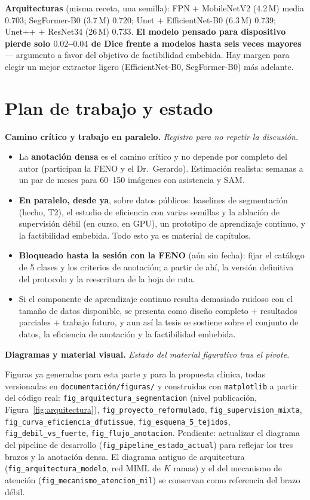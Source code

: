 \documentclass[12pt,letterpaper]{report}
\newcommand{\entrada}[2]{%
    \vspace{0.6em}
    \noindent\textbf{#1.} \textit{#2}
    \vspace{0.3em}
    \par
}
\begin{document}
\textbf{Arquitecturas} (misma receta, una semilla): FPN $+$ MobileNetV2 (4.2\,M) media $0.703$;
SegFormer-B0 (3.7\,M) $0.720$; Unet $+$ EfficientNet-B0 (6.3\,M) $0.739$; Unet++ $+$ ResNet34
(26\,M) $0.733$. \textbf{El modelo pensado para dispositivo pierde solo $0.02$--$0.04$ de Dice frente
a modelos hasta seis veces mayores} --- argumento a favor del objetivo de factibilidad embebida. Hay
margen para elegir un mejor extractor ligero (EfficientNet-B0, SegFormer-B0) más adelante.

\section{Plan de trabajo y estado}

\entrada{Camino crítico y trabajo en paralelo}{Registro para no repetir la discusión.}

\begin{itemize}[leftmargin=1.5em]
    \item La \textbf{anotación densa} es el camino crítico y no depende por completo del autor
        (participan la FENO y el Dr.\ Gerardo). Estimación realista: semanas a un par de meses para
        60--150 imágenes con asistencia y SAM.
    \item \textbf{En paralelo, desde ya}, sobre datos públicos: baselines de segmentación (hecho, T2),
        el estudio de eficiencia con varias semillas y la ablación de supervisión débil (en curso, en
        GPU), un prototipo de aprendizaje continuo, y la factibilidad embebida. Todo esto ya es
        material de capítulos.
    \item \textbf{Bloqueado hasta la sesión con la FENO} (aún sin fecha): fijar el
        catálogo de 5 clases y los criterios de anotación; a partir de ahí, la versión definitiva del
        protocolo y la reescritura de la hoja de ruta.
    \item Si el componente de aprendizaje continuo resulta demasiado ruidoso con el tamaño de datos
        disponible, se presenta como diseño completo + resultados parciales + trabajo futuro, y aun
        así la tesis se sostiene sobre el conjunto de datos, la eficiencia de anotación y la
        factibilidad embebida.
\end{itemize}

\entrada{Diagramas y material visual}{Estado del material figurativo tras el pivote.}

Figuras ya generadas para esta parte y para la propuesta clínica, todas versionadas en
\texttt{documentación/figuras/} y construidas con \texttt{matplotlib} a partir del código real:
\texttt{fig\_arquitectura\_segmentacion} (nivel publicación, Figura~\ref{fig:arquitectura}),
\texttt{fig\_proyecto\_reformulado}, \texttt{fig\_supervision\_mixta},
\texttt{fig\_curva\_eficiencia\_dfutissue}, \texttt{fig\_esquema\_5\_tejidos},
\texttt{fig\_debil\_vs\_fuerte}, \texttt{fig\_flujo\_anotacion}. Pendiente: actualizar el diagrama del
pipeline de desarrollo (\texttt{fig\_pipeline\_estado\_actual}) para reflejar los tres brazos y la
anotación densa. El diagrama antiguo de arquitectura (\texttt{fig\_arquitectura\_modelo}, red MIML de
$K$ ramas) y el del mecanismo de atención (\texttt{fig\_mecanismo\_atencion\_mil}) se conservan como
referencia del brazo débil.
\end{document}
